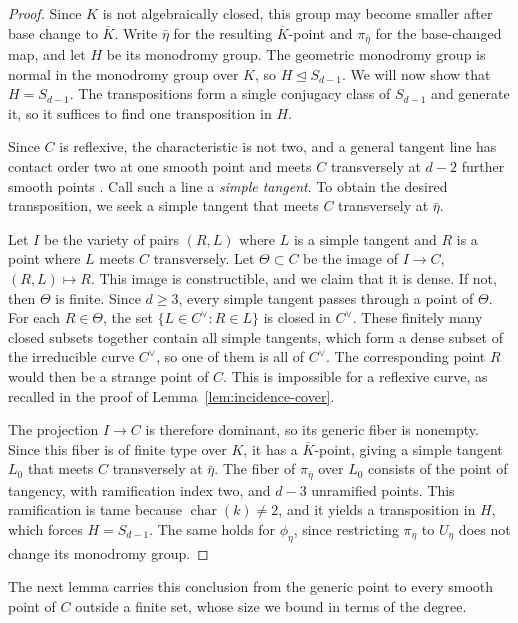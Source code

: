 \documentclass[10pt,a4paper]{amsart}
\theoremstyle{definition}
\theoremstyle{remark}
\begin{document}
\begin{proof}
Since $K$ is not algebraically closed, this group may become smaller after base change to $\overline K$. Write $\bar\eta$ for the resulting $\overline K$-point and $\pi_{\bar\eta}$ for the base-changed map, and let $H$ be its monodromy group. The geometric monodromy group is normal in the monodromy group over $K$, so $H\trianglelefteq S_{d-1}$. We will now show that $H=S_{d-1}$. The transpositions form a single conjugacy class of $S_{d-1}$ and generate it, so it suffices to find one transposition in $H$.

Since $C$ is reflexive, the characteristic is not two, and a general tangent line has contact order two at one smooth point and meets $C$ transversely at $d-2$ further smooth points \cite[Section~2]{Ent21}. Call such a line a \emph{simple tangent}. To obtain the desired transposition, we seek a simple tangent
that meets $C$ transversely at $\bar\eta$.

Let $I$ be the variety of pairs $(R,L)$ where $L$ is a simple tangent and $R$ is a point where $L$ meets $C$ transversely. Let $\Theta\subset C$ be the image of $I\to C$, $(R,L)\mapsto R$. This image is constructible, and we claim that it is dense. If not, then $\Theta$ is finite. Since $d\geq3$, every simple tangent passes through a point of $\Theta$. For each $R\in\Theta$, the set $\{L\in C^\vee:R\in L\}$ is closed in $C^\vee$. These finitely many closed subsets together contain all simple tangents, which form a dense subset of the irreducible curve $C^\vee$, so one of them is all of $C^\vee$. The corresponding point $R$ would then be a strange point of $C$. This is impossible for a reflexive curve, as recalled in the proof of Lemma~\ref{lem:incidence-cover}.

The projection $I\to C$ is therefore dominant, so its generic fiber is nonempty. Since this fiber is of finite type over $K$, it has a $\overline K$-point, giving a simple tangent $L_0$ that meets $C$ transversely at $\bar\eta$. The fiber of $\pi_{\bar\eta}$ over $L_0$ consists of the point of tangency, with ramification index two, and $d-3$ unramified points. This ramification is tame because $\operatorname{char}(k)\neq2$, and it yields a transposition in $H$, which forces $H=S_{d-1}$. The same holds for $\phi_\eta$, since restricting $\pi_\eta$ to $U_\eta$ does not change its monodromy group.
\end{proof}

The next lemma carries this conclusion from the generic point to every smooth point of $C$ outside a finite set, whose size we bound in terms of the degree.
\end{document}
